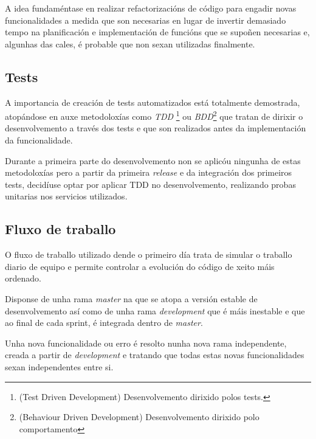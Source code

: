     A idea fundaméntase en realizar refactorizacións de código para engadir 
novas funcionalidades a medida que son necesarias en lugar de invertir 
demasiado tempo na planificación e implementación de funcións que se supoñen 
necesarias e, algunhas das cales, é probable que non sexan utilizadas
finalmente.

    \subsection{Tests}
    A importancia de creación de tests automatizados está totalmente 
demostrada, atopándose en auxe metodoloxías como \emph{TDD} \footnote{(Test 
Driven Development) Desenvolvemento dirixido polos tests.} ou 
\emph{BDD}\footnote{(Behaviour Driven Development) Desenvolvemento dirixido 
polo comportamento} que tratan de dirixir o desenvolvemento a través dos tests e
que son realizados antes da implementación da funcionalidade.

    Durante a primeira parte do desenvolvemento non se aplicóu ningunha de 
estas metodoloxías pero a partir da primeira \emph{release} e da integración 
dos primeiros tests, decidíuse optar por aplicar TDD no desenvolvemento, 
realizando probas unitarias nos servicios utilizados.

    \subsection{Fluxo de traballo}
    O fluxo de traballo utilizado dende o primeiro día trata de simular o 
traballo diario de equipo e permite controlar a evolución do código de xeito 
máis ordenado.

    Disponse de unha rama \emph{master} na que se atopa a versión estable de 
desenvolvemento así como de unha rama \emph{development} que é máis inestable e 
que ao final de cada sprint, é integrada dentro de \emph{master}.

    Unha nova funcionalidade ou erro é resolto nunha nova rama independente,
creada a partir de \emph{development} e tratando que todas estas novas 
funcionalidades sexan independentes entre si.


